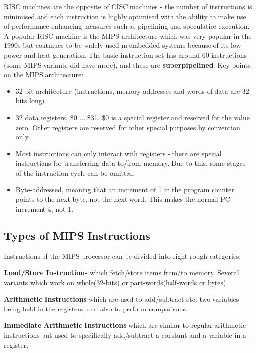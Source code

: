 \documentclass{article}
\begin{document}
	\par 
	RISC machines are the opposite of CISC machines - the number of instructions is minimised and each instruction is highly optimised with the ability to make use of performance-enhancing measures such as pipelining and speculatice execution. A popular RISC machine is the MIPS architecture which was very popular in the 1990s but continues to be widely used in embedded systems because of its low power and heat generation. The basic instruction set has around 60 instructions (some MIPS variants did have more), and these are \textbf{superpipelined}. Key points on the MIPS architecture:
	\begin{itemize}
		\item 32-bit architecture (instructions, memory addresses and words of data are 32 bits long)
		\item 32 data registers, \$0 ... \$31. \$0 is a special register and reserved for the value zero. Other registers are reserved for other special purposes by convention only.
		\item Most instructions can only interact with registers - there are special instructions for transferring data to/from memory. Due to this, some stages of the instruction cycle can be omitted.
		\item Byte-addressed, meaning that an increment of 1 in the program counter points to the next byte, not the next word. This makes the normal PC increment 4, not 1.
	\end{itemize}
	
	\subsection{Types of MIPS Instructions}
	Instructions of the MIPS processor can be divided into eight rough categories:
	
	\par 
	\textbf{Load/Store Instructions} which fetch/store items from/to memory. Several variants which work on whole(32-bits) or part-words(half-words or bytes).
	
	\par 
	\textbf{Arithmetic Instructions} which are used to add/subtract etc. two variables being held in the registers, and also to perform comparisons.
	
	\par 
	\textbf{Immediate Arithmetic Instructions} which are similar to regular arithmetic instructions but used to specifically add/subtract a constant and a variable in a register.
	
\end{document}
